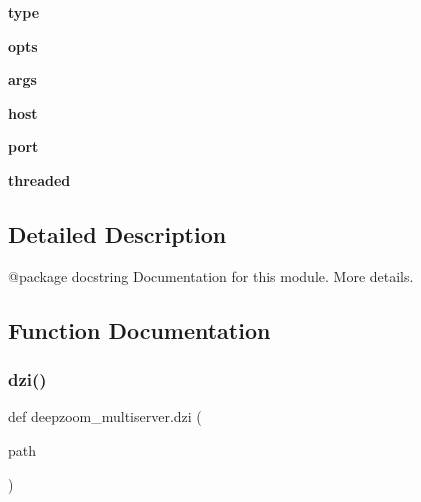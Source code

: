 \begin{DoxyCompactItemize}
{\bfseries type}
\item 
\mbox{\label{namespacedeepzoom__multiserver_a95b71617de5cfd66ce6faeee6295f76a}} 
{\bfseries opts}
\item 
\mbox{\label{namespacedeepzoom__multiserver_a942ca17db2f736d3a8687fe9c7e9036b}} 
{\bfseries args}
\item 
\mbox{\label{namespacedeepzoom__multiserver_a4a554fb5392c07b50d33c8dd989f9f2e}} 
{\bfseries host}
\item 
\mbox{\label{namespacedeepzoom__multiserver_aa78acc85c0c209d013c4d5605151d701}} 
{\bfseries port}
\item 
\mbox{\label{namespacedeepzoom__multiserver_a892f761d829f5014fd6d940bc1721dc8}} 
{\bfseries threaded}
\end{DoxyCompactItemize}


\subsection{Detailed Description}
\begin{DoxyVerb}@package docstring
Documentation for this module.
More details.
\end{DoxyVerb}
 

\subsection{Function Documentation}
\mbox{\label{namespacedeepzoom__multiserver_a213d1b03dc1051e9011528b975a144ec}} 
\subsubsection{\texorpdfstring{dzi()}{dzi()}}
{\footnotesize\ttfamily def deepzoom\+\_\+multiserver.\+dzi (\begin{DoxyParamCaption}\item[{}]{path }\end{DoxyParamCaption})}

